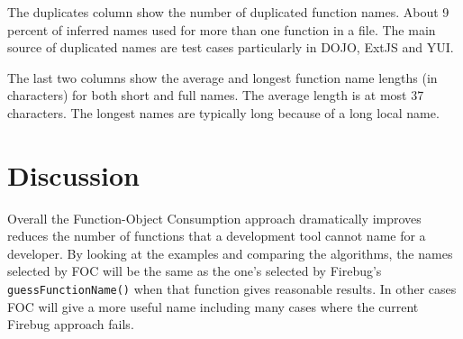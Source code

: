\documentclass[10pt, preprint]{sigplanconf}
\begin{document}
The duplicates column show the number of duplicated function names. About 9 percent of inferred names used for more than one function in a file. The main source of duplicated names are test cases particularly in DOJO, ExtJS and YUI. 

The last two columns show the average and longest function name lengths (in characters) for both short and full names. The average length is at most 37 characters. The longest  names are typically long because of a long local name.  



   

\section{Discussion}
Overall the Function-Object Consumption approach dramatically improves reduces the number of functions that a development tool cannot name for a developer.  By looking at the examples and comparing the algorithms, the names selected by FOC will be the same as the one's selected by  Firebug's {\small \texttt{guessFunctionName()}} when that function gives reasonable results. In other cases FOC will give a more useful name including many cases where the current Firebug approach fails. 
\end{document}
